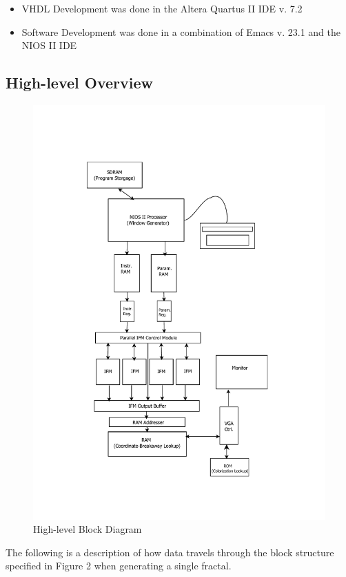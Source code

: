 \documentclass{article}
\begin{document}
\begin{itemize}
\item VHDL Development was done in the Altera Quartus II IDE v. 7.2
\item Software Development was done in a combination of Emacs v. 23.1 and the NIOS II IDE
\end{itemize}

\subsection{High-level Overview}


\begin{figure}\label{fig:block}
  \centering
	\includegraphics[width=\textwidth]{block_diagrams/juli_arch.pdf}
  \caption{High-level Block Diagram}
\end{figure}

The following is a description of how data travels through the block structure specified in Figure 2 when generating a single fractal.
\end{document}

